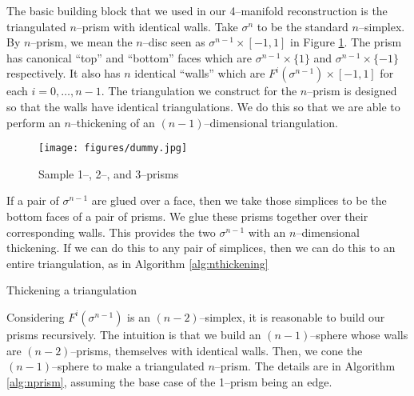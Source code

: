 The basic building block that we used in our 4--manifold reconstruction is the triangulated $n$--prism with identical walls.
Take $\sigma^n$ to be the standard $n$--simplex.
By $n$--prism, we mean the $n$--disc seen as $\sigma^{n-1}\times [-1,1]$ in Figure \ref{fig:nprism}.
The prism has canonical ``top'' and ``bottom'' faces which are $\sigma^{n-1}\times \{1\}$ and $\sigma^{n-1}\times \{-1\}$ respectively.
It also has $n$ identical ``walls'' which are $F^i(\sigma^{n-1})\times [-1,1]$ for each $i=0,\dots,n-1$.
The triangulation we construct for the $n$--prism is designed so that the walls have identical triangulations.
We do this so that we are able to perform an $n$--thickening of an $(n-1)$--dimensional triangulation.

\begin{figure}
	\centering
	\captionsetup{justification=centering}
	\caption{Sample 1--, 2--, and 3--prisms}
	\texttt{[image: figures/dummy.jpg]}
	\label{fig:nprism}
\end{figure}

If a pair of $\sigma^{n-1}$ are glued over a face, then we take those simplices to be the bottom faces of a pair of prisms.
We glue these prisms together over their corresponding walls.
This provides the two $\sigma^{n-1}$ with an $n$--dimensional thickening.
If we can do this to any pair of simplices, then we can do this to an entire triangulation, as in Algorithm \ref{alg:nthickening}

\begin{algorithm}[h]
	\caption{Thickening a triangulation}
	\label{alg:nthickening}
\end{algorithm}

Considering $F^i(\sigma^{n-1})$ is an $(n-2)$--simplex, it is reasonable to build our prisms recursively.
The intuition is that we build an $(n-1)$--sphere whose walls are $(n-2)$--prisms, themselves with identical walls.
Then, we cone the $(n-1)$--sphere to make a triangulated $n$--prism.
The details are in Algorithm \ref{alg:nprism}, assuming the base case of the 1--prism being an edge.

